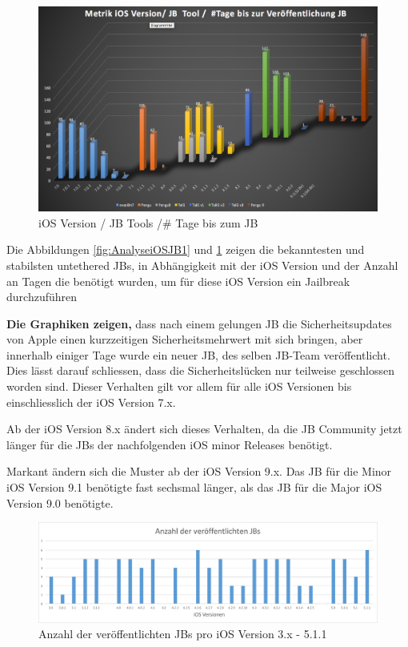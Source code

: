 \begin{figure}[htbp!]
        \centering
                \includegraphics[scale=0.43]{Bilder/Frage1_2.png}
        \caption{iOS Version / JB Tools /\# Tage bis zum JB}
        \label{fig:AnalyseiOSJB2}
\end{figure}

Die Abbildungen \ref{fig:AnalyseiOSJB1} und \ref{fig:AnalyseiOSJB2} zeigen die bekanntesten und stabilsten untethered JBs, in Abhängigkeit mit der iOS Version und der Anzahl an Tagen die benötigt wurden, um für diese iOS Version ein Jailbreak durchzuführen \par 
\textbf{Die Graphiken zeigen,} dass nach einem gelungen JB die Sicherheitsupdates von Apple einen kurzzeitigen Sicherheitsmehrwert mit sich bringen, aber innerhalb einiger Tage wurde ein neuer JB, des selben JB-Team veröffentlicht. Dies lässt darauf schliessen, dass die Sicherheitslücken nur teilweise geschlossen worden sind. Dieser Verhalten gilt vor allem für alle iOS Versionen bis einschliesslich der iOS Version 7.x.\par  
Ab der iOS Version 8.x ändert sich dieses Verhalten, da die JB Community jetzt länger für die JBs der nachfolgenden iOS minor Releases benötigt. \par 
Markant ändern sich die Muster ab der iOS Version 9.x. Das JB für die Minor iOS Version 9.1 benötigte fast sechsmal länger, als das JB für die Major iOS Version 9.0 benötigte.\par

\begin{figure}[htbp!]
        \centering
                \includegraphics[scale=0.5]{Bilder/iOSJB1.png}
        \caption{Anzahl der veröffentlichten JBs pro iOS Version 3.x - 5.1.1}
        \label{fig:AnalyseAnzahliOSJB1}
\end{figure}

